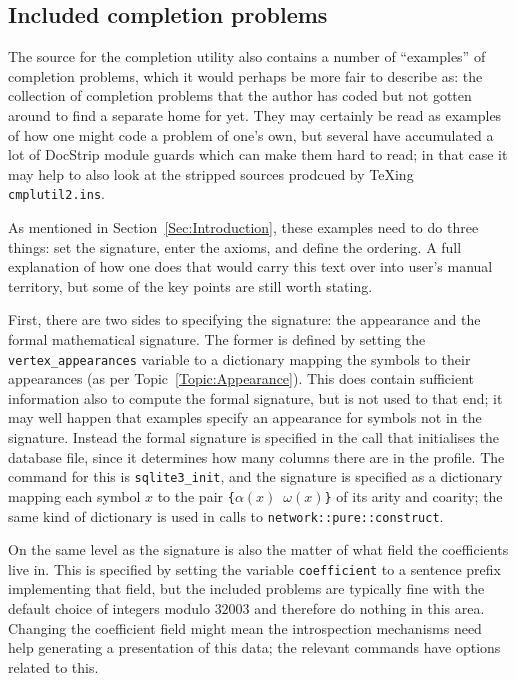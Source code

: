 \documentclass{article}
\theoremstyle{definition}
\begin{document}
\subsection{Included completion problems}

The source for the completion utility also contains a number of 
``examples'' of completion problems, which it would perhaps be more 
fair to describe as: the collection of completion problems that the 
author has coded but not gotten around to find a separate home for 
yet. They may certainly be read as examples of how one might code a 
problem of one's own, but several have accumulated a lot of 
\textsf{DocStrip} module guards which can make them hard to read; in 
that case it may help to also look at the stripped sources prodcued 
by \TeX ing \texttt{cmplutil2.ins}.

As mentioned in Section~\ref{Sec:Introduction}, these examples need 
to do three things: set the signature, enter the axioms, and define 
the ordering. A full explanation of how one does that would carry 
this text over into user's manual territory, but some of the key 
points are still worth stating.

First, there are two sides to specifying the signature: the 
appearance and the formal mathematical signature. The former is 
defined by setting the \verb|vertex_appearances| variable to a 
dictionary mapping the symbols to their appearances (as per 
Topic~\ref{Topic:Appearance}). This does contain sufficient 
information also to compute the formal signature, but is not used to 
that end; it may well happen that examples specify an appearance for 
symbols not in the signature. Instead the formal signature is 
specified in the call that initialises the database file, since it 
determines how many columns there are in the profile. The command for 
this is \verb|sqlite3_init|, and the signature is specified as a 
dictionary mapping each symbol $x$ to the pair 
\verb|{|$\alpha(x)$~$\omega(x)$\verb|}| of its arity and coarity; the 
same kind of dictionary is used in calls to 
\texttt{network::pure::construct}.

On the same level as the signature is also the matter of what field 
the coefficients live in. This is specified by setting the variable 
\verb|coefficient| to a sentence prefix implementing that field, but 
the included problems are typically fine with the default choice of 
integers modulo $32003$ and therefore do nothing in this area. 
Changing the coefficient field might mean the introspection mechanisms 
need help generating a presentation of this data; the relevant 
commands have options related to this.
\end{document}
